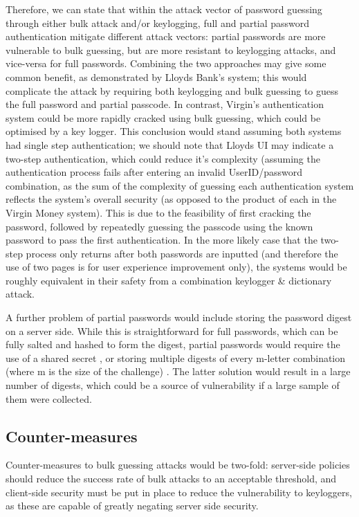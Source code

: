 \documentclass[british,11pt,a4paper]{article}
\begin{document}
Therefore, we can state that within the attack vector of password guessing through either bulk attack and/or keylogging, full and partial password authentication mitigate different attack vectors: partial passwords are more vulnerable to bulk guessing, but are more resistant to keylogging attacks, and vice-versa for full passwords. Combining the two approaches may give some common benefit, as demonstrated by Lloyds Bank's system; this would complicate the attack by requiring both keylogging and bulk guessing to guess the full password and partial passcode. In contrast, Virgin's authentication system could be more rapidly cracked using bulk guessing, which could be optimised by a key logger. This conclusion would stand assuming both systems had single step authentication; we should note that Lloyds UI may indicate a two-step authentication, which could reduce it's complexity (assuming the authentication process fails after entering an invalid UserID/password combination, as the sum of the complexity of guessing each authentication system reflects the system's overall security (as opposed to the product of each in the Virgin Money system). This is due to the feasibility of first cracking the password, followed by repeatedly guessing the passcode using the known password to pass the first authentication. In the more likely case that the two-step process only returns after both passwords are inputted (and therefore the use of two pages is for user experience improvement only), the systems would be roughly equivalent in their safety from a combination keylogger \& dictionary attack.

A further problem of partial passwords would include storing the password digest on a server side. While this is straightforward for full passwords, which can be fully salted and hashed to form the digest, partial passwords would require the use of a shared secret \cite{smartarchitect}, or storing multiple digests of every m-letter combination (where m is the size of the challenge) \cite{smartarchitect}. The latter solution would result in a large number of digests, which could be a source of vulnerability if a large sample of them were collected. 





\subsection{Counter-measures}
Counter-measures to bulk guessing attacks would be two-fold: server-side policies should reduce the success rate of bulk attacks to an acceptable threshold, and client-side security must be put in place to reduce the vulnerability to keyloggers, as these are capable of greatly negating server side security. 
\end{document}
